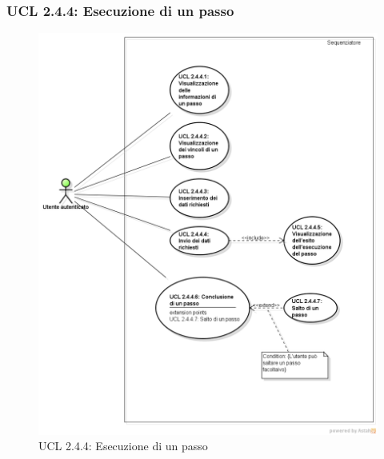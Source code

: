 \hypertarget{L2.4.4}{}
\subsubsection{UCL 2.4.4: Esecuzione di un passo}
\begin{figure}[H]
\centering
\includegraphics[trim=0cm 0.8cm 0cm 0cm,clip=true,width=%
\textwidth]
{./grafici/L244}
\caption{UCL 2.4.4: Esecuzione di un passo}
\end{figure}
